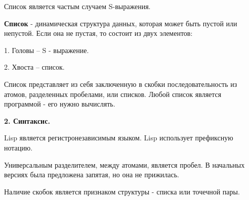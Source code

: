 Список является частым случаем S-выражения.



\textbf{Список} - динамическая структура данных, которая может быть
пустой или непустой. Если она не пустая, то состоит из двух элементов:

1. Головы -- S - выражение.

2. Хвоста -- список.

Список представляет из себя заключенную в скобки
последовательность из атомов, разделенных пробелами, или списков.
Любой список является программой - его нужно вычислять.


\textbf{2. Синтаксис.}










Lisp является регистронезависимым языком. Lisp использует префиксную нотацию.

Универсальным разделителем, между атомами, является пробел. В начальных версиях была предложена запятая, но она не прижилась.

Наличие скобок является признаком структуры - списка или точечной пары.


